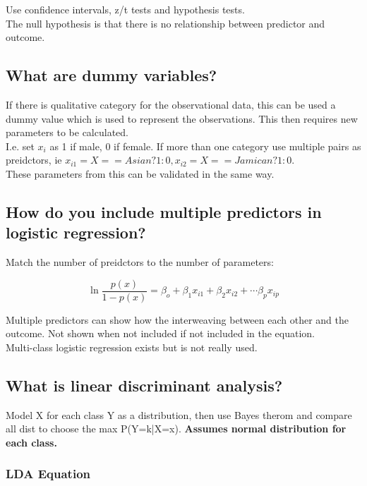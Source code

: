 \documentclass[11pt]{scrartcl} %
\begin{document}
Use confidence intervals, z/t tests and hypothesis tests.\\

The null hypothesis is that there is no relationship between predictor and outcome.

\subsection{What are dummy variables?}

If there is qualitative category for the observational data, this can be used a dummy value which is used to represent
the observations. This then requires new parameters to be calculated.\\

I.e. set \(x_i\) as 1 if male, 0 if female. If more than one category use multiple pairs as preidctors, ie 
\(x_{i1} = X==Asian?1:0, x_{i2} = X==Jamican?1:0\).\\

These parameters from this can be validated in the same way.

\subsection{How do you include multiple predictors in logistic regression?}

Match the number of preidctors to the number of parameters:

\begin{equation}
	\ln\frac{p(x)}{1-p(x)} = \beta_o + \beta_1x_{i1} + \beta_2x_{i2} + \cdots \beta_px_{ip}
\end{equation}

Multiple predictors can show how the interweaving between each other and the outcome. Not shown when not included if 
not included in the equation.\\

Multi-class logistic regression exists but is not really used.

\subsection{What is linear discriminant analysis?}

Model X for each class Y as a distribution, then use Bayes therom and compare all dist to choose the max P(Y=k|X=x).
\textbf{Assumes normal distribution for each class.}

\subsubsection{LDA Equation}
\end{document}
